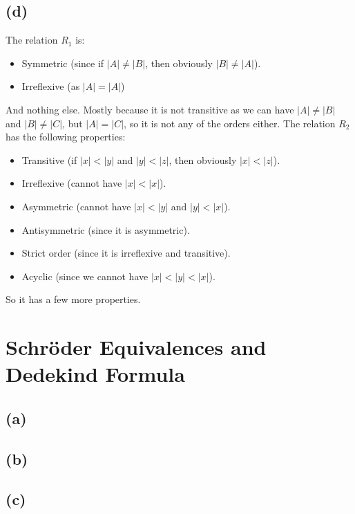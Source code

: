\documentclass[a4paper, fleqn]{article}
\begin{document}
\subsection{(d)}
The relation $R_1$ is:
\begin{itemize}
  \item Symmetric (since if $|A|\neq |B|$, then obviously $|B|\neq|A|$).
  \item Irreflexive (as $|A| = |A|$)
\end{itemize}
And nothing else. Mostly because it is not transitive as we can have $|A|\neq |B|$ and
$|B|\neq |C|$, but $|A|=|C|$, so it is not any of the orders either. The relation $R_2$ has the
following properties:
\begin{itemize}
  \item Transitive (if $|x|<|y|$ and $|y|<|z|$, then obviously $|x|<|z|$).
  \item Irreflexive (cannot have $|x|<|x|$).
  \item Asymmetric (cannot have $|x|<|y|$ and $|y|<|x|$).
  \item Antisymmetric (since it is asymmetric).
  \item Strict order (since it is irreflexive and transitive).
  \item Acyclic (since we cannot have $|x|<|y|<|x|$).
\end{itemize}
So it has a few more properties.

\section{Schröder Equivalences and Dedekind Formula}
\subsection{(a)}

\subsection{(b)}

\subsection{(c)}
\end{document}

